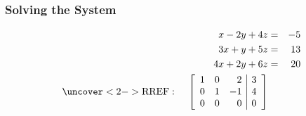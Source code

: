 \begin{frame}
  \frametitle{Solving the System}

  \begin{eqnarray*}
    x - 2y + 4z  & = & -5 \\
    3x + y + 5z  & = & 13 \\
    4x + 2y + 6z & = & 20 \\
    \uncover<2->
    {
      \mathrm{RREF: } 
      \stateThree{~}{~}{~}
      \startRowOps
      \oneRowOps{1}{0}{2}{3}
      \oneRowOps{0}{1}{-1}{4}
      \oneRowOps{0}{0}{0}{0}
      \stopRowOps
    }
  \end{eqnarray*}


\end{frame}

